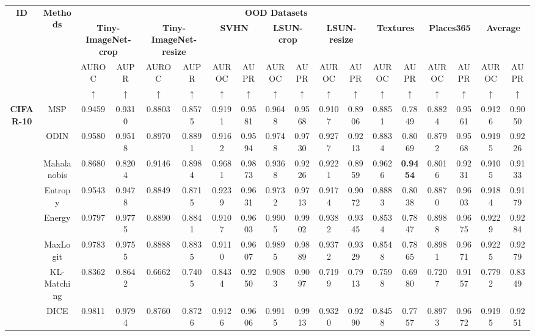 \documentclass[letterpaper]{article} %
\begin{document}
\begin{table}[!ht]
\renewcommand\arraystretch{1.0}
\begin{adjustbox}{width=17.8cm,center}
\begin{tabular}{c|c|cccccccccccccc|cc} \toprule
\multirow{4}{*}{\textbf{ID}} & \multirow{4}{*}{\textbf{Methods}} & \multicolumn{14}{c}{\textbf{OOD Datasets}} \\
 &  & \multicolumn{2}{c}{\textbf{Tiny-ImageNet-crop}} & \multicolumn{2}{c}{\textbf{Tiny-ImageNet-resize}} & \multicolumn{2}{c}{\textbf{SVHN}} & \multicolumn{2}{c}{\textbf{LSUN-crop}} & \multicolumn{2}{c}{\textbf{LSUN-resize}} & \multicolumn{2}{c}{\textbf{Textures}} & \multicolumn{2}{c|}{\textbf{Places365}}& \multicolumn{2}{c}{\textbf{Average}} \\
 &  & AUROC & AUPR & AUROC & AUPR & AUROC & AUPR & AUROC & AUPR & AUROC & AUPR & AUROC & AUPR & AUROC & AUPR & AUROC & AUPR\\
 &  & $\uparrow$ & $\uparrow$ & $\uparrow$ & $\uparrow$ & $\uparrow$ & $\uparrow$ & $\uparrow$ & $\uparrow$ & $\uparrow$ & $\uparrow$ & $\uparrow$ & $\uparrow$ & $\uparrow$ & $\uparrow$ &$\uparrow$ & $\uparrow$\\ \midrule
\multirow{12}{*}{\textbf{CIFAR-10}}
 & MSP & 0.9459	&0.9310	&0.8803	&0.8575	&0.9191	&0.9581	&0.9648	&0.9568	&0.9107	&0.8906	&0.8851	&0.7849	&0.8824	&0.9561&0.9126	&0.9050\\
 & ODIN  &0.9580	&0.9518	&0.8970	&0.8891	&0.9162	&0.9594	&0.9748	&0.9730	&0.9277	&0.9213	&0.8834	&0.8069&0.8792	&0.9568	&0.9195	&0.9226\\
 & Mahalanobis   &0.8680	&0.8204	&0.9146	&0.8984	&0.9681	&0.9873	&0.9368	&0.9226	&0.9221&0.8959 &0.9626&\textbf{0.9454}	&0.8016	&0.9231	&0.9105	&0.9133\\
 & Entropy &0.9543	&0.9478	&0.8849	&0.8715	&0.9239	&0.9631	&0.9732	&0.9713	&0.9174	&0.9072	&0.8883	&0.8038&0.8870	&0.9603	&0.9184	&0.9179\\
 & Energy  &0.9797	&0.9775	&0.8890	&0.8841	&0.9107	&0.9603	&0.9905	&0.9902	&0.9382	&0.9345	&0.8534	&0.7847&0.8988	&0.9675	&0.9229	&0.9284\\
 & MaxLogit  &0.9783	&0.9755	&0.8888	&0.8835	&0.9110	&0.9607	&0.9895	&0.9889	&0.9372	&0.9329	&0.8548	&0.7865	&0.8981	&0.9671	&0.9225	&0.9279\\
 & KL-Matching &0.8362	&0.8642	&0.6662	&0.7405	&0.8434	&0.9250	&0.9083	&0.9097	&0.7199	&0.7913	&0.7598	&0.6980	&0.7207	&0.9157	&0.7792	&0.8349\\
 & DICE &0.9811	&0.9794	&0.8760	&0.8726	&0.9126	&0.9606	&0.9915	&0.9913	&0.9320	&0.9290	&0.8458	&0.7757&0.8973	&0.9672	&0.9195	&0.9251\\

\end{tabular}
\end{adjustbox}
\end{table}
\end{document}
